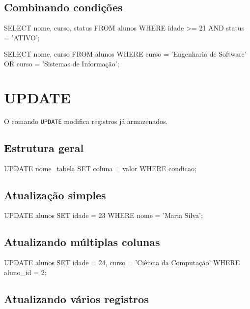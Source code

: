 \subsection{Combinando condições}

\begin{sqlcode}
SELECT nome, curso, status
FROM alunos
WHERE idade >= 21 AND status = 'ATIVO';
\end{sqlcode}

\begin{sqlcode}
SELECT nome, curso
FROM alunos
WHERE curso = 'Engenharia de Software'
   OR curso = 'Sistemas de Informação';
\end{sqlcode}

\section{UPDATE}

O comando \texttt{UPDATE} modifica registros já armazenados.

\subsection{Estrutura geral}

\begin{sqlcode}
UPDATE nome_tabela
SET coluna = valor
WHERE condicao;
\end{sqlcode}

\subsection{Atualização simples}

\begin{sqlcode}
UPDATE alunos
SET idade = 23
WHERE nome = 'Maria Silva';
\end{sqlcode}

\subsection{Atualizando múltiplas colunas}

\begin{sqlcode}
UPDATE alunos
SET idade = 24,
    curso = 'Ciência da Computação'
WHERE aluno_id = 2;
\end{sqlcode}

\subsection{Atualizando vários registros}


